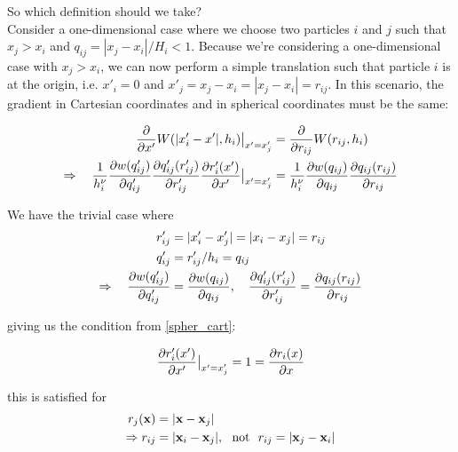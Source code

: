 So which definition should we take? \\


Consider a one-dimensional case where we choose two particles $i$ and $j$ such that $x_j > x_i$ and $q_{ij} = | x_j - x_i | / H_i < 1$.
Because we're considering a one-dimensional case with $x_j > x_i$, we can now perform a simple translation such that particle $i$ is at the origin, i.e. $x'_i = 0$ and $x'_j = x_j - x_i = | x_j - x_i | = r_{ij}$.
In this scenario, the gradient in Cartesian coordinates and in spherical coordinates must be the same:


\begin{align}
	\frac{\del}{\del x'} W (|x_i' - x'|, h_i)  \big{|}_{x' = x_j' } &= \frac{\del}{\del r_{ij}} W (r_{ij}, h_i) 		\nonumber\\
%
	\Rightarrow \quad \frac{1}{h_i^\nu} \frac{\del w(q'_{ij})}{\del q'_{ij}} \frac{\del q'_{ij}(r'_{ij})}{\del r'_{ij}} \frac{\del r'_{i}(x')}{\del x'}	  \big{|}_{x' = x_j' }  &=
		\frac{1}{h_i^\nu} \frac{\del w(q_{ij})}{\del q_{ij}} \frac{\del q_{ij}(r_{ij})}{\del r_{ij}}				\label{spher_cart}
\end{align}




We have the trivial case where
\begin{align*}
	r'_{ij} &= |x_i' - x_j'| = | x_i - x_j | = r_{ij} \\
	q'_{ij} &= r'_{ij}/h_i = q_{ij} \\
	\Rightarrow \quad \frac{\partial w(q'_{ij})}{\partial q'_{ij}} &= \frac{\partial w(q_{ij})}{\partial q_{ij}}, \quad \frac{\partial q'_{ij}(r'_{ij})}{\partial r'_{ij}} = \frac{\partial q_{ij}(r_{ij})}{\partial r_{ij}}
\end{align*}



giving us the condition from \ref{spher_cart}:






\begin{equation}
	\frac{\partial r'_{i}(x')}{\partial x'}	  \big{|}_{x' = x_j' } = 1 = \frac{\partial r_{i}(x)}{\partial x}
\end{equation}


this is satisfied for
\begin{align*}
	r_j(\mathbf{x}) &= | \mathbf{x} - \mathbf{x}_j | \\ 
	\Rightarrow r_{ij} &= | \mathbf{x}_i - \mathbf{x}_j |,\ \text{ not } \ r_{ij} = | \mathbf{x}_j - \mathbf{x}_i |
\end{align*}

